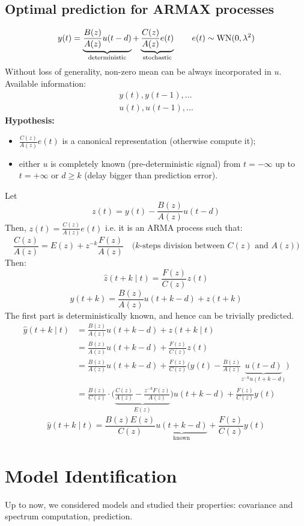 \section{Optimal prediction for ARMAX processes}

\[
	y(t)=\underbrace{\frac{B(z)}{A(z)} u(t-d)}_{\text{deterministic}}+
	\underbrace{\frac{C(z)}{A(z)} e(t)}_{\text{stochastic}}\qquad e(t)\sim \operatorname{WN}(0,\lambda^2 )
\]
Without loss of generality, non-zero mean can be always incorporated in $u$. Available information:
\begin{gather*}
	y(t),y(t-1),\ldots \\
	u(t),u(t-1),\ldots
\end{gather*}
\textbf{Hypothesis:}
\begin{itemize}
	\item $\frac{C(z)}{A(z)}e(t)$ is a canonical representation (otherwise compute it);
	\item either $u$ is completely known (pre-deterministic signal) from $t=-\infty$ up to $t=+\infty$ or $d\geq k$ (delay bigger than prediction error).
\end{itemize}
Let 
$$
	z(t)=y(t)-\frac{B(z)}{A(z)} u(t-d)
$$
Then, $z(t)=\frac{C(z)}{A(z)} e(t)$ i.e. it is an ARMA process such that:
$$
	\frac{C(z)}{A(z)}=E(z)+z^{-k} \frac{F(z)}{A(z)} \quad\text{($k$-steps division between $C(z)$ and $A(z)$)}
$$
Then:
$$
	\hat{z}(t+k \mid t)=\frac{F(z)}{C(z)} z(t)
$$
$$
	y(t+k)=\frac{B(z)}{A(z)} u(t+k-d)+z(t+k)
$$
The first part is deterministically known, and hence can be trivially predicted.
\begin{align*}
	\hat{y}(t+k \mid t)&=\frac{B(z)}{A(z)} u(t+k-d)+z(t+k \mid t) \\
	&=\frac{B(z)}{A(z)} u(t+k-d)+\frac{F(z)}{C(z)} z(t) \\
	& =\frac{B(z)}{A(z)} u(t+k-d)+\frac{F(z)}{C(z)}\Bigg(y(t)-\frac{B(z)}{A(z)} \underbrace{u(t-d)}_{z^{-k}u(t+k-d)}\Bigg) \\
	&=\frac{B(z)}{C(z)} \cdot\Bigg(\underbrace{\frac{C(z)}{A(z)}-\frac{z^{-k} F(z)}{A(z)}}_{E(z)}\Bigg) u(t+k-d)+\frac{F(z)}{C(z)} y(t)
\end{align*}
$$
	\boxed{\hat{y}(t+k \mid t) =\frac{B(z) E(z)}{C(z)} \underbrace{u(t+k-d)}_{\text{known}}+\frac{F(z)}{C(z)} y(t)}
$$

\chapter{Model Identification}

Up to now, we considered models and studied their properties: covariance and spectrum computation, prediction.

